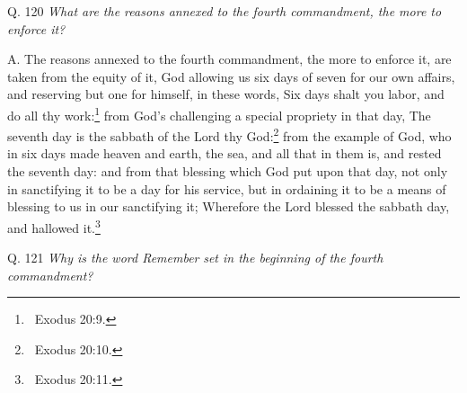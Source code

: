 {{{\bigskip

Q. 120 \textit{What are the reasons annexed to the fourth commandment}\textit{, the more to enforce it}\textit{?}

A. The reasons annexed to the fourth commandment, the more to enforce
it, are taken from the equity of it, God allowing us
six days of seven for our own affairs, and reserving
but one for himself, in these words, Six days shalt you labor, and do all thy
work:\footnote{\ Exodus 20:9.} from God's challenging a special propriety
in that day, The seventh day is the
sabbath of the Lord thy God:\footnote{\ Exodus 20:10.} from the example of God, who in six days made
heaven and earth, the sea, and all that in them is, and rested the seventh day: and
from that blessing which God put upon that day, not only in sanctifying it to be a day
for his service, but in ordaining it to be a means of blessing to us in our sanctifying it; Wherefore the Lord blessed
the sabbath day, and hallowed it.\footnote{\ Exodus
20:11.}


\bigskip

Q. 121 \textit{Why is the word Remember}\textit{ set in the beginning of the
fourth commandment}\textit{?}

}}}
